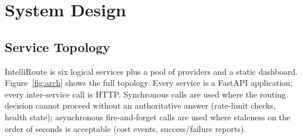 \documentclass[conference,letterpaper]{IEEEtran}
\begin{document}
\section{System Design}\label{sec:design}

\subsection{Service Topology}
IntelliRoute is six logical services plus a pool of providers and a
static dashboard. Figure~\ref{fig:arch} shows the full topology.
Every service is a FastAPI application; every inter-service call is
HTTP. Synchronous calls are used where the routing decision cannot
proceed without an authoritative answer (rate-limit checks, health
state); asynchronous fire-and-forget calls are used where staleness
on the order of seconds is acceptable (cost events, success/failure
reports).
\end{document}
